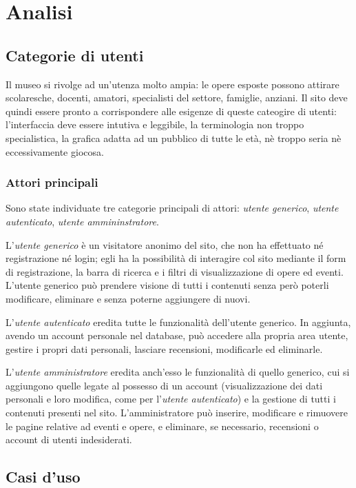 \section{Analisi}
\label{analisi}

\subsection{Categorie di utenti}
\label{analisi-categorie-utenti}
Il museo si rivolge ad un'utenza molto ampia: le opere esposte possono attirare scolaresche, docenti, amatori, specialisti del settore, famiglie, anziani. Il sito deve quindi essere pronto a corrispondere alle esigenze di queste cateogire di utenti: l'interfaccia deve essere intutiva e leggibile, la terminologia non troppo specialistica, la grafica adatta ad un pubblico di tutte le età, nè troppo seria nè eccessivamente giocosa.

\subsubsection{Attori principali}
\label{analisi-casi-uso-attori-principali}
Sono state individuate tre categorie principali di attori: \textit{utente generico}, \textit{utente autenticato}, \textit{utente ammininstratore}.

L'\textit{utente generico} è un visitatore anonimo del sito, che non ha effettuato né registrazione né login; egli ha la possibilità di interagire col sito mediante il form di registrazione, la barra di ricerca e i filtri di visualizzazione di opere ed eventi. L'utente generico può prendere visione di tutti i contenuti senza però poterli modificare, eliminare e senza poterne aggiungere di nuovi.

L'\textit{utente autenticato} eredita tutte le funzionalità dell'utente generico. In aggiunta, avendo un account personale nel database, può accedere alla propria area utente, gestire i propri dati personali, lasciare recensioni, modificarle ed eliminarle.

L'\textit{utente amministratore} eredita anch'esso le funzionalità di quello generico, cui si aggiungono quelle legate al possesso di un account (visualizzazione dei dati personali e loro modifica, come per l'\textit{utente autenticato}) e  la gestione di tutti i contenuti presenti nel sito. L'amministratore può inserire, modificare e rimuovere le pagine relative ad eventi e opere, e eliminare, se necessario, recensioni o account di utenti indesiderati.


\subsection{Casi d'uso}
\label{analisi-casi-uso}

